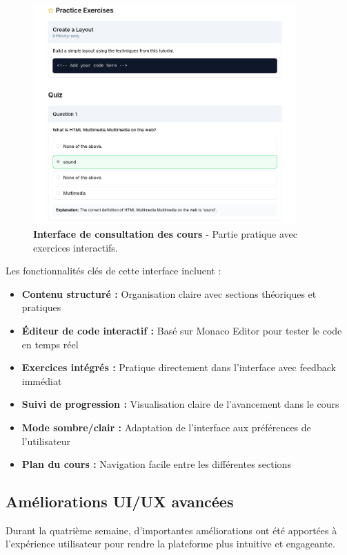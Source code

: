 \begin{figure}[H]
  \centering
  \includegraphics[width=0.9\textwidth,keepaspectratio]{week_3_img/part2.png}
  \caption{\textbf{Interface de consultation des cours} - Partie pratique avec exercices interactifs.}
  \label{fig:course_practice}
\end{figure}

Les fonctionnalités clés de cette interface incluent :
\begin{itemize}
  \item \textbf{Contenu structuré :} Organisation claire avec sections théoriques et pratiques
  \item \textbf{Éditeur de code interactif :} Basé sur Monaco Editor pour tester le code en temps réel
  \item \textbf{Exercices intégrés :} Pratique directement dans l'interface avec feedback immédiat
  \item \textbf{Suivi de progression :} Visualisation claire de l'avancement dans le cours
  \item \textbf{Mode sombre/clair :} Adaptation de l'interface aux préférences de l'utilisateur
  \item \textbf{Plan du cours :} Navigation facile entre les différentes sections
\end{itemize}

\subsection{Améliorations UI/UX avancées}

Durant la quatrième semaine, d'importantes améliorations ont été apportées à l'expérience utilisateur pour rendre la plateforme plus intuitive et engageante.

